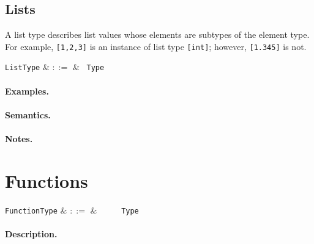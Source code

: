 
\subsection{Lists}
\label{c_types_list}

A list type describes list values whose elements are subtypes of the element type. For example, \lstinline{[1,2,3]} is an instance of list type \lstinline{[int]}; however, \lstinline{[1.345]} is not.

\begin{syntax}
  \verb+ListType+ & $::=$ & \token{[} \ \verb+Type+ \ \token{]}\\
\end{syntax}

\paragraph{Examples.}

\paragraph{Semantics.}

\paragraph{Notes.} 


\section{Functions}

\begin{syntax}
  \verb+FunctionType+ & $::=$ & \ \token{(}\
  \ \token{)}\ \token{=>}\ \verb+Type+\\
\end{syntax}

\paragraph{Description.}  

